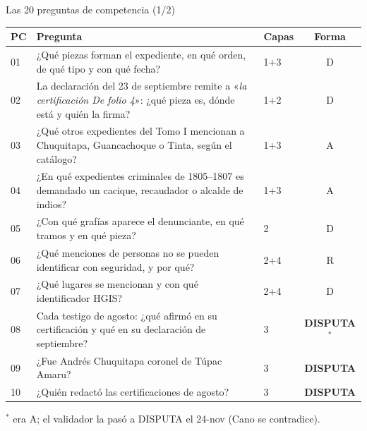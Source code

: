 \documentclass[aspectratio=169,10pt]{beamer}
\newcommand{\cita}[1]{«\textit{#1}»}
\begin{document}
\begin{frame}{Las 20 preguntas de competencia (1/2)}
\scriptsize
\begin{tabular}{@{}lp{9.6cm}lc@{}}
\toprule
PC & Pregunta & Capas & Forma \\
\midrule
01 & ¿Qué piezas forman el expediente, en qué orden, de qué tipo y con qué fecha? & 1+3 & D \\
02 & La declaración del 23 de septiembre remite a \cita{la certificación De folio 4}: ¿qué pieza es, dónde está y quién la firma? & 1+2 & D \\
03 & ¿Qué otros expedientes del Tomo I mencionan a Chuquitapa, Guancachoque o Tinta, según el catálogo? & 1+3 & A \\
04 & ¿En qué expedientes criminales de 1805--1807 es demandado un cacique, recaudador o alcalde de indios? & 1+3 & A \\
05 & ¿Con qué grafías aparece el denunciante, en qué tramos y en qué pieza? & 2 & D \\
06 & ¿Qué menciones de personas no se pueden identificar con seguridad, y por qué? & 2+4 & R \\
07 & ¿Qué lugares se mencionan y con qué identificador HGIS? & 2+4 & D \\
08 & Cada testigo de agosto: ¿qué afirmó en su certificación y qué en su declaración de septiembre? & 3 & \textbf{DISPUTA}$^*$ \\
09 & ¿Fue Andrés Chuquitapa coronel de Túpac Amaru? & 3 & \textbf{DISPUTA} \\
10 & ¿Quién redactó las certificaciones de agosto? & 3 & \textbf{DISPUTA} \\
\bottomrule
\end{tabular}

\medskip
\footnotesize $^*$ era A; el validador la pasó a DISPUTA el 24-nov (Cano se contradice).
\end{frame}
\end{document}
